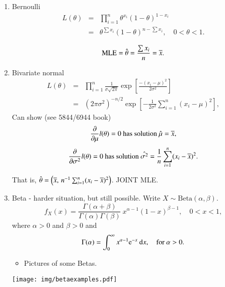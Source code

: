 \documentclass[11pt,english]{scrbook}
\begin{document}
\begin{enumerate}
\item Bernoulli
\label{sec:org4d0d98a}
\begin{eqnarray*}
L(\theta) & = & \prod_{i=1}^{n}\theta^{x_{i}}(1-\theta)^{1-x_{i}}\\
 & = & \theta^{\sum x_{i}}(1-\theta)^{n-\sum x_{i}},\quad0<\theta<1.
\end{eqnarray*}

\[
\mathrm{MLE} = \hat{\theta} = \frac{\sum x_{i}}{n} = \overline{x}. 
\]

\item Bivariate normal
\label{sec:org804381a}
\begin{eqnarray*}
L(\theta) & = & \prod_{i=1}^{n}\frac{1}{\sigma\sqrt{2\pi}}\exp\left[\frac{-(x_{i}-\mu)^{2}}{2\sigma^{2}}\right]\\
 & = & (2\pi\sigma^{2})^{-n/2}\exp\left[-\frac{1}{2\sigma^{2}}\sum_{i=1}^{n}(x_{i}-\mu)^{2}\right],
\end{eqnarray*}
Can show (see 5844/6944 book)
\[
\frac{\partial}{\partial\mu}l(\theta) = 0 \mbox{ has solution } \hat{\mu}=\overline{x},
\]
\[
\frac{\partial}{\partial\sigma^{2}}l(\theta) = 0 \mbox{ has solution } \hat{\sigma^{2}}=\frac{1}{n}\sum_{i=1}^{n}(x_{i} - \overline{x})^{2}.
\]

That is, \(\hat{\theta} = \left(\overline{x},\,n^{-1}\sum_{i=1}^{n}(x_{i} - \overline{x})^{2}\right)\).  JOINT MLE.

\item Beta - harder situation, but still possible.
\label{sec:org92ba871}
Write \(X \sim \mathrm{Beta}(\alpha,\beta)\).
\begin{equation}
f_{X}(x)=\frac{\Gamma(\alpha+\beta)}{\Gamma(\alpha)\Gamma(\beta)}\: x^{\alpha-1}(1-x)^{\beta-1},\quad0 < x <1,
\end{equation}
where \(\alpha > 0\) and \(\beta > 0\) and
\begin{equation}
\Gamma(\alpha)=\int_{0}^{\infty}x^{\alpha-1}\mathrm{e}^{-x}\:\mathrm{d} x,\quad\mbox{for }\alpha>0.
\end{equation}


\begin{itemize}
\item Pictures of some Betas.
\end{itemize}

\begin{center}
\begin{center}
\texttt{[image: img/betaexamples.pdf]}
\end{center}


\end{center}
\end{enumerate}
\end{document}
